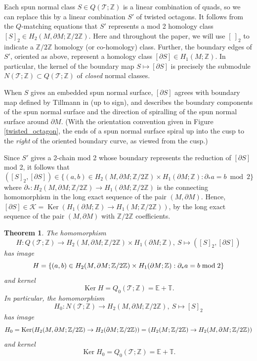 \documentclass[12pt,reqno]{amsart}  %
\newtheorem{thm}{Theorem}[section]
\theoremstyle{definition}
\theoremstyle{remark}
\newcommand{\TT}{\mathbb{T}}
\newcommand{\T}{\mathcal{T}}
\def\Z{\mathbb Z}
\def\bd{\partial}
\DeclareMathOperator{\Ker}{Ker}
\let\Im\relax
\DeclareMathOperator{\Im}{Im}
\def\TT{\mathbb T}   %
\def\EE{\mathbb E}   %
\begin{document}
Each spun normal class $S \in Q(\T;\Z)$ is a linear combination of quads, so 
we can replace this by a linear combination $S'$ of twisted octagons. It 
follows from the $Q$-matching equations that  $S'$ represents a mod 2 
homology class $[S]_2 \in H_2(M,\bd M; \Z/2\Z)$. Here and throughout the 
paper, we will use $[~]_2$ to indicate a $\Z/2\Z$ homology (or co-homology) 
class. Further, the boundary edges of $S'$, oriented as above, represent 
a homology class $[\bd S] \in H_1(M;\Z)$. In particular, the kernel of the 
boundary map $S \mapsto [\bd S]$ is precisely the  submodule 
$N(\T;\Z) \subset Q(\T;\Z)$ of {\em  closed} normal classes. 

When $S$ gives an embedded spun normal surface,  $[\bd S]$ agrees with 
boundary map defined by Tillmann in \cite{Ti} (up to sign), and describes 
the boundary components of the spun normal surface and the direction of 
spiralling of the spun normal surface around $\bd M$.  (With the 
orientation convention given in Figure \ref{twisted_octagon}, the ends of 
a spun normal surface spiral up into the cusp to the {\em right} of the 
oriented boundary curve, as viewed from the cusp.)

Since $S'$ gives a 2-chain mod 2 whose boundary represents the reduction of 
$[\bd S]$ mod 2, it follows that 
$$
([S]_2,[\bd S]) \in \{ (a,b) \in  H_2(M,\bd M;\Z/2\Z) \times H_1(\bd M;\Z) : 
\bd_* a =   b \bmod 2  \}
$$
where $\bd_*: H_2(M,\bd M;\Z/2\Z) \to H_1(\bd M;\Z/2\Z) $ is the connecting 
homomorphism in the long exact sequence of the pair $(M, \bd M)$.   
Hence, $[\bd S] \in {\mathcal K} =\Ker(H_1(\bd M;\Z) \to H_1(M;\Z/2\Z))$, 
by the long exact sequence of the pair $(M,\bd M)$ with $\Z/2\Z$ coefficients.

\begin{thm} 
\label{ZQNT_struct_thm}
The homomorphism 
$$
H:  Q(\T;\Z) \to H_2(M,\bd M;\Z/2\Z) \times H_1(\bd M;\Z),~ S 
\mapsto ([S]_2,[\bd S])
$$
has image 
$$
\Im H =\{ (a,b) \in H_2(M,\bd M;\Z/2\Z) \times  H_1(\bd M;\Z) :  
\bd_* a =  b \bmod 2 \}
$$
and kernel
$$
\Ker H = Q_0(\T;\Z) = \EE + \TT.
$$
In particular, the homomorphism
$$
H_0:  N(\T;\Z) \to  H_2(M,\bd M;\Z/2\Z),~ S \mapsto [S]_2
$$
has image
$$
\Im H_0 = \Ker( H_2(M,\bd M;\Z/2\Z) \to H_2(\bd M;\Z/2\Z)) 
=  \Im ( H_2(M;\Z/2\Z) \to H_2(M,\bd M;\Z/2\Z) )
$$
and kernel
$$
\Ker H_0 =Q_0(\T;\Z)= \EE + \TT.
$$
\end{thm}
\end{document}
